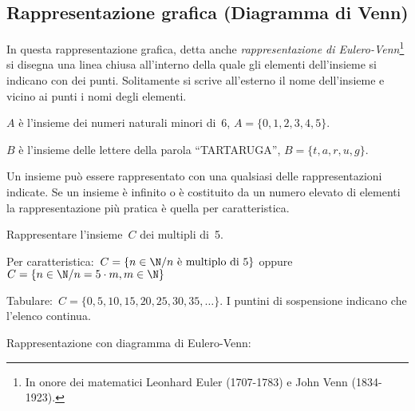 

\subsection{Rappresentazione grafica (Diagramma di Venn)}
\label{subsec:rappr_venn}

In questa rappresentazione grafica, detta anche \textit{rappresentazione
di Eulero-Venn}\footnote{In onore dei matematici Leonhard Euler (1707-1783) 
e John Venn (1834-1923).} si disegna una linea chiusa all'interno della 
quale gli elementi dell'insieme si indicano con dei punti. Solitamente si 
scrive all'esterno il nome dell'insieme e vicino ai punti i nomi degli 
elementi.

 \begin{esempio}
 \(A\) è l'insieme dei numeri naturali minori di~6, 
 \(A=\{0, 1, 2, 3, 4, 5\}\).
 \begin{center}
  
 \end{center}

 \end{esempio}

 \begin{esempio}
 \(B\) è l'insieme delle lettere della parola ``TARTARUGA'', 
 \(B=\{t, a, r, u, g\}\).
 \begin{center}
  
 \end{center}

 \end{esempio}


Un insieme può essere rappresentato con una qualsiasi delle
rappresentazioni indicate. Se un insieme è infinito o è costituito
da un numero elevato di elementi la rappresentazione più pratica è
quella per caratteristica.

 \begin{esempio}
 Rappresentare l'insieme~\(C\) dei multipli di~5.

 Per caratteristica:~\(C=\{n\in\N/n\text{ è multiplo di }5\}\) oppure
\(C=\{n\in\N/n=5\cdot m,m\in\N\}\)

Tabulare:~\(C=\{0, 5, 10, 15, 20, 25, 30, 35,\dots\}\). I puntini di 
sospensione indicano che l'elenco continua.

Rappresentazione con diagramma di Eulero-Venn:
\begin{center}
 
\end{center}
 \end{esempio}

